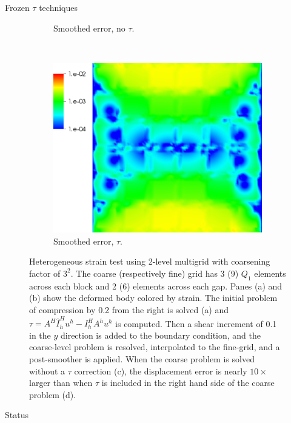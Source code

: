 \documentclass[final,t]{beamer}
\begin{document}
\begin{frame}{}
\begin{columns}
\begin{column}{0.31\textwidth}
\begin{block}{Frozen $\tau$ techniques}
\begin{figure}
\begin{subfigure}[b]{0.28\textwidth}
            \caption{\scriptsize Smoothed error, no $\tau$.}\label{fig:elast-error-notau}
          \end{subfigure} ~
          \begin{subfigure}[b]{0.28\textwidth}
            \includegraphics[width=\textwidth]{figures/MG/ElasticityCompressErrorTauTrim}
            \caption{\scriptsize Smoothed error, $\tau$.}\label{fig:elast-error-tau}
          \end{subfigure}
          \caption{Heterogeneous strain test using 2-level multigrid with coarsening factor of $3^2$.
            The coarse (respectively fine) grid has 3 (9) $Q_1$ elements across each block and 2 (6) elements across each gap.
            Panes (a) and (b) show the deformed body colored by strain.
            The initial problem of compression by 0.2 from the right is solved (a) and $\tau = A^H \hat I_h^H u^h - I_h^H A^h u^h$ is computed.
            Then a shear increment of 0.1 in the $y$ direction is added to the boundary condition, and the coarse-level problem is resolved, interpolated to the fine-grid, and a post-smoother is applied.
            When the coarse problem is solved without a $\tau$ correction (c), the displacement error is nearly $10\times$ larger than when $\tau$ is included in the right hand side of the coarse problem (d).
          }\label{fig:tau-valid}
        \end{figure}
      \end{block}
      \vspace{-2em}
      \begin{block}{Status}

\end{block}
\end{column}
\end{columns}
\end{frame}
\end{document}
